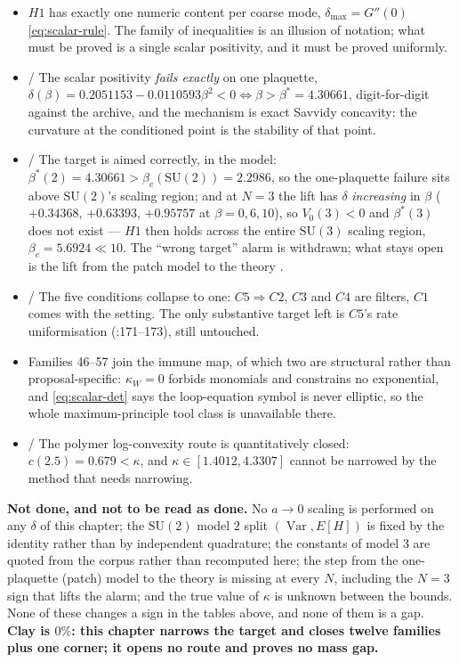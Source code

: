 \begin{itemize}
\item \LT{} $H1$ has exactly one numeric content per coarse mode, $\delta_{\max}=G''(0)$
  \eqref{eq:scalar-rule}. The family of inequalities is an illusion of notation; what must be
  proved is a single scalar positivity, and it must be proved uniformly.
\item \LT{}/\LE{} The scalar positivity \emph{fails exactly} on one plaquette,
  $\delta(\beta)=0.2051153-0.0110593\beta^2<0\iff\beta>\beta^*=4.30661$, digit-for-digit against
  the archive, and the mechanism is exact Savvidy concavity: the curvature at the conditioned point
  is the stability of that point.
\item \LE{}/\LM{} The target is aimed correctly, in the model:
  $\beta^*(2)=4.30661>\beta_c(\mathrm{SU}(2))=2.2986$, so the one-plaquette failure sits above
  $\mathrm{SU}(2)$'s scaling region; and at $N=3$ the lift has $\delta$ \emph{increasing} in $\beta$
  ($+0.34368$, $+0.63393$, $+0.95757$ at $\beta=0,6,10$), so $V_0(3)<0$ and $\beta^*(3)$ does not
  exist --- $H1$ then holds across the entire $\mathrm{SU}(3)$ scaling region, $\beta_c=5.6924\ll10$.
  The ``wrong target'' alarm is withdrawn; what stays open is the lift from the patch model to the
  theory \LM.
\item \LN{}/\LM{} The five conditions collapse to one: $C5\Rightarrow C2$, $C3$ and $C4$ are
  filters, $C1$ comes with the setting. The only substantive target left is $C5$'s rate
  uniformisation (:171--173), still untouched.
\item \LN{} Families 46--57 join the immune map, of which two are structural rather than
  proposal-specific: $\kappa_W=0$ forbids monomials and constrains no exponential, and
  \eqref{eq:scalar-det} says the loop-equation symbol is never elliptic, so the whole
  maximum-principle tool class is unavailable there.
\item \LN{}/\LE{} The polymer log-convexity route is quantitatively closed: $c(2.5)=0.679<\kappa$,
  and $\kappa\in[1.4012,4.3307]$ cannot be narrowed by the method that needs narrowing.
\end{itemize}

\textbf{Not done, and not to be read as done.} No $a\to0$ scaling is performed on any $\delta$ of
this chapter; the $\mathrm{SU}(2)$ model $2$ split $(\operatorname{Var},E[H])$ is fixed by the
identity rather than by independent quadrature; the constants of model $3$ are quoted from the
corpus rather than recomputed here; the step from the one-plaquette (patch) model to the theory is
missing at every $N$, including the $N=3$ sign that lifts the alarm; and the true value of
$\kappa$ is unknown between the bounds. None of these changes a sign in the tables above, and none
of them is a gap. \textbf{Clay is $0\%$: this chapter narrows the target and closes twelve families
plus one corner; it opens no route and proves no mass gap.}
